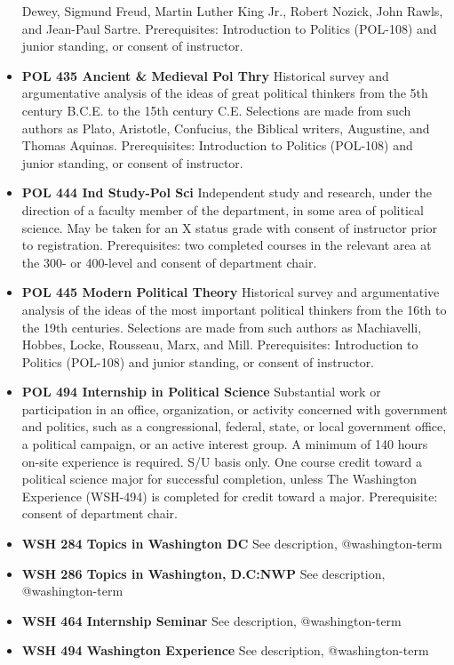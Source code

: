 \documentclass[
  letterpaper,
]{scrbook}
\begin{document}
\begin{itemize}
  Dewey, Sigmund Freud, Martin Luther King Jr., Robert Nozick, John
  Rawls, and Jean-Paul Sartre. Prerequisites: Introduction to Politics
  (POL-108) and junior standing, or consent of instructor.
\item
  \textbf{POL 435 Ancient \& Medieval Pol Thry} Historical survey and
  argumentative analysis of the ideas of great political thinkers from
  the 5th century B.C.E. to the 15th century C.E. Selections are made
  from such authors as Plato, Aristotle, Confucius, the Biblical
  writers, Augustine, and Thomas Aquinas. Prerequisites: Introduction to
  Politics (POL-108) and junior standing, or consent of instructor.\\
\item
  \textbf{POL 444 Ind Study-Pol Sci} Independent study and research,
  under the direction of a faculty member of the department, in some
  area of political science. May be taken for an X status grade with
  consent of instructor prior to registration. Prerequisites: two
  completed courses in the relevant area at the 300- or 400-level and
  consent of department chair.
\item
  \textbf{POL 445 Modern Political Theory} Historical survey and
  argumentative analysis of the ideas of the most important political
  thinkers from the 16th to the 19th centuries. Selections are made from
  such authors as Machiavelli, Hobbes, Locke, Rousseau, Marx, and Mill.
  Prerequisites: Introduction to Politics (POL-108) and junior standing,
  or consent of instructor.
\item
  \textbf{POL 494 Internship in Political Science} Substantial work or
  participation in an office, organization, or activity concerned with
  government and politics, such as a congressional, federal, state, or
  local government office, a political campaign, or an active interest
  group. A minimum of 140 hours on-site experience is required. S/U
  basis only. One course credit toward a political science major for
  successful completion, unless The Washington Experience (WSH-494) is
  completed for credit toward a major. Prerequisite: consent of
  department chair.
\item
  \textbf{WSH 284 Topics in Washington DC} See description,
  @washington-term
\item
  \textbf{WSH 286 Topics in Washington, D.C:NWP} See description,
  @washington-term
\item
  \textbf{WSH 464 Internship Seminar} See description, @washington-term
\item
  \textbf{WSH 494 Washington Experience} See description,
  @washington-term
\end{itemize}
\end{document}
